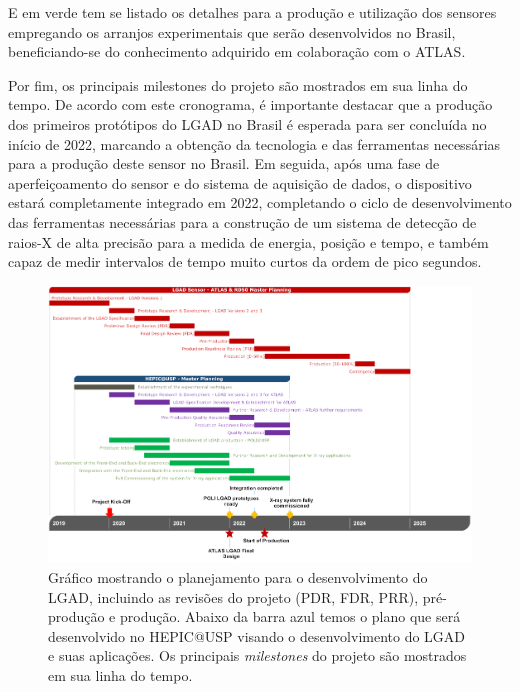 E em verde tem se listado os detalhes para a produção e utilização dos sensores empregando os arranjos experimentais que serão desenvolvidos no Brasil, beneficiando-se do conhecimento adquirido em colaboração com o ATLAS.

Por fim, os principais milestones do projeto são mostrados em sua linha do tempo. De acordo com este cronograma, é importante destacar que a produção dos primeiros protótipos do LGAD no Brasil é esperada para ser concluída no início de 2022, marcando a obtenção da tecnologia e das ferramentas necessárias para a produção deste sensor no Brasil. Em seguida, após uma fase de aperfeiçoamento do sensor e do sistema de aquisição de dados, o dispositivo estará completamente integrado em 2022, completando o ciclo de desenvolvimento das ferramentas necessárias para a construção de um sistema de detecção de raios-X de alta precisão para a medida de energia, posição e tempo, e também capaz de medir intervalos de tempo muito curtos da ordem de pico segundos.

\begin{figure}
    \centering
    \includegraphics[width=18.0cm]{assets/cronograma.png}
    \caption{Gráfico mostrando o planejamento para o desenvolvimento do LGAD, incluindo as revisões do projeto (PDR, FDR, PRR), pré-produção e produção. Abaixo da barra azul temos o plano que será desenvolvido no HEPIC@USP visando o desenvolvimento do LGAD e suas aplicações. Os principais {\it milestones} do projeto são mostrados em sua linha do tempo.}
    \label{cronograma}
\end{figure}